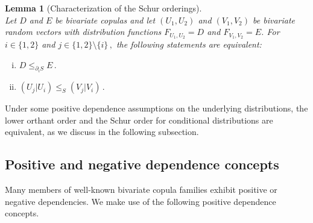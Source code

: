 \documentclass{article}
\newtheorem{lemma}[theorem]{Lemma}
\begin{document}
\begin{lemma}[Characterization of the Schur orderings]\label{lemcharschur}~\\
    Let \(D\) and \(E\) be bivariate copulas and let \((U_1,U_2)\) and \((V_1,V_2)\) be bivariate random vectors with distribution functions \(F_{U_1,U_2}=D\) and \(F_{V_1,V_2}=E\).
    For \(i\in \{1,2\}\) and \(j\in \{1,2\}\setminus \{i\}\,,\) the following statements are equivalent:
    \begin{enumerate}[(i)]
        \item \(D\leq_{\partial_i S} E\,.\)
        \item \((U_j|U_i) \leq_{S} (V_j|V_i)\,.\)
    \end{enumerate}
\end{lemma}

Under some positive dependence assumptions on the underlying distributions, the lower orthant order and the Schur order for conditional distributions are equivalent, as we discuss in the following subsection.


\subsection{Positive and negative dependence concepts}
\label{subsec:pos_and_neg_dep_concepts}

Many members of well-known bivariate copula families exhibit positive or negative dependencies.
We make use of the following positive dependence concepts.
\end{document}
